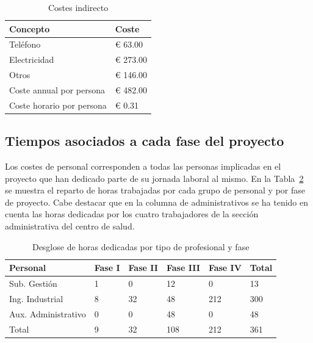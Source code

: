 \begin{table}[H]
    \centering
    \begin{tabular}{ll}
        \toprule
        Concepto                  & Coste    \\
        \midrule
        Teléfono                  & € 63.00  \\
        Electricidad              & € 273.00 \\
        Otros                     & € 146.00 \\
        \midrule
        Coste annual por persona  & € 482.00 \\
        Coste horario por persona & € 0.31   \\
        \bottomrule
    \end{tabular}
    \caption{Costes indirecto}
    \label{tab:coste-indirecto}
\end{table}

\subsection{Tiempos asociados a cada fase del proyecto}

Los costes de personal corresponden a todas las personas implicadas en el proyecto que han dedicado parte de su jornada laboral al mismo.
En la Tabla~\ref{tab:horas-trabajadas} se muestra el reparto de horas trabajadas por cada grupo de personal y por fase de proyecto.
Cabe destacar que en la columna de administrativos se ha tenido en cuenta las horas dedicadas por los cuatro trabajadores de la sección administrativa del centro de salud.

\begin{table}[H]
    \centering
    \begin{tabular}{llllll}
        \toprule
        Personal            & Fase I & Fase II & Fase III & Fase IV & Total \\
        \midrule
        Sub. Gestión        & 1      & 0       & 12       & 0       & 13    \\
        Ing. Industrial     & 8      & 32      & 48       & 212     & 300   \\
        Aux. Administrativo & 0      & 0       & 48       & 0       & 48    \\
        \midrule
        Total               & 9      & 32      & 108      & 212     & 361   \\
        \bottomrule
    \end{tabular}
    \caption{Desglose de horas dedicadas por tipo de profesional y fase}
    \label{tab:horas-trabajadas}
\end{table}

